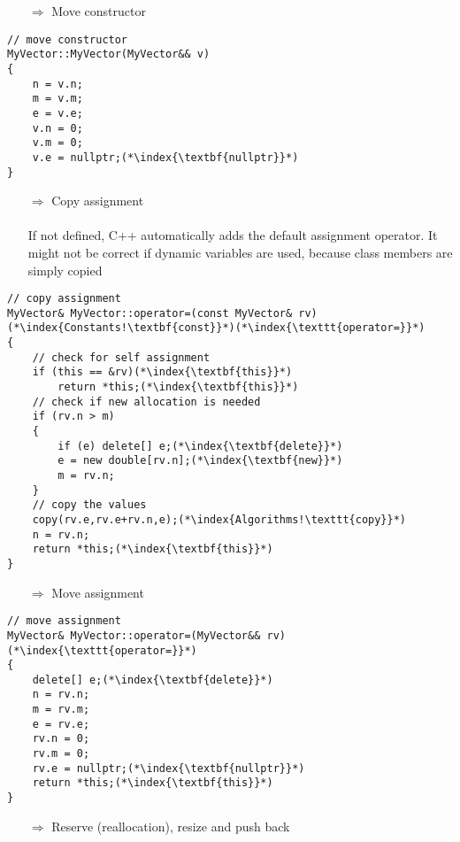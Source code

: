 \documentclass[10pt]{article}
\begin{document}
\begin{enumerate}
\item[$\Rightarrow$] Move constructor
\end{enumerate}
\begin{lstlisting}
// move constructor
MyVector::MyVector(MyVector&& v)
{
    n = v.n;
    m = v.m;
    e = v.e;
    v.n = 0;
    v.m = 0;
    v.e = nullptr;(*\index{\textbf{nullptr}}*)
}
\end{lstlisting}
\begin{enumerate}
\item[$\Rightarrow$] Copy assignment\\ \\ If not defined, C++ automatically adds  the default assignment operator.
It might not be correct if dynamic variables are used,
because class members are simply copied
\end{enumerate}
\begin{lstlisting}
// copy assignment
MyVector& MyVector::operator=(const MyVector& rv)(*\index{Constants!\textbf{const}}*)(*\index{\texttt{operator=}}*)
{
    // check for self assignment
    if (this == &rv)(*\index{\textbf{this}}*)
        return *this;(*\index{\textbf{this}}*)
    // check if new allocation is needed
    if (rv.n > m)
    {
        if (e) delete[] e;(*\index{\textbf{delete}}*)
        e = new double[rv.n];(*\index{\textbf{new}}*)
        m = rv.n;
    }
    // copy the values
    copy(rv.e,rv.e+rv.n,e);(*\index{Algorithms!\texttt{copy}}*)
    n = rv.n;
    return *this;(*\index{\textbf{this}}*)
}
\end{lstlisting}
\begin{enumerate}
\item[$\Rightarrow$] Move assignment
\end{enumerate}
\begin{lstlisting}
// move assignment
MyVector& MyVector::operator=(MyVector&& rv)(*\index{\texttt{operator=}}*)
{
    delete[] e;(*\index{\textbf{delete}}*)
    n = rv.n;
    m = rv.m;
    e = rv.e;
    rv.n = 0;
    rv.m = 0;
    rv.e = nullptr;(*\index{\textbf{nullptr}}*)
    return *this;(*\index{\textbf{this}}*)
}
\end{lstlisting}
\begin{enumerate}
\item[$\Rightarrow$] Reserve (reallocation), resize and push back
\end{enumerate}
\end{document}
